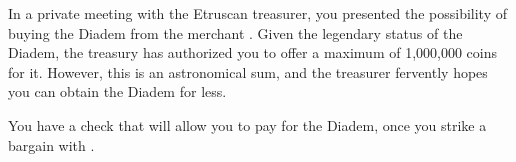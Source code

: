 \documentclass[green]{Kos}
\begin{document}
\name{\gEtruriaDiadem{}}

In a private meeting with the Etruscan treasurer, you presented the possibility of buying the Diadem from the merchant \cMerchant{}. Given the legendary status of the Diadem, the treasury has authorized you to offer a maximum of 1,000,000 coins for it. However, this is an astronomical sum, and the treasurer fervently hopes you can obtain the Diadem for less.

You have a check that will allow you to pay for the Diadem, once you strike a bargain with \cMerchant{}.
\end{document}
